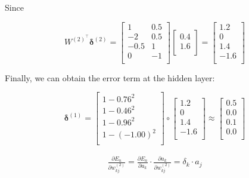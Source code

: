 \begin{solution}
    Since

    \[
        W^{(2)}^\intercal\bm{\delta}^{(2)}
        =
        \begin{bmatrix}
            1    & 0.5 \\
            -2   & 0.5 \\
            -0.5 & 1   \\
            0    & -1  \\
        \end{bmatrix}
        \begin{bmatrix}
            0.4 \\
            1.6 \\
        \end{bmatrix}
        =
        \begin{bmatrix}
            1.2  \\
            0    \\
            1.4  \\
            -1.6 \\
        \end{bmatrix}
    \]

    Finally, we can obtain the error term at the hidden layer:

    \[
        \bm{\delta}^{(1)} =
        \begin{bmatrix}
            1 - 0.76^2    \\
            1 - 0.46^2    \\
            1 - 0.96^2    \\
            1 - (-1.00)^2 \\
        \end{bmatrix}
        \circ
        \begin{bmatrix}
            1.2  \\
            0    \\
            1.4  \\
            -1.6 \\
        \end{bmatrix}
        \approx
        \begin{bmatrix}
            0.5 \\
            0.0 \\
            0.1 \\
            0.0 \\
        \end{bmatrix}
    \]


    \[
        \begin{align*}
            \frac{\partial E_n}{\partial w^{(2)}_{kj}}
            = \frac{\partial E_n}{\partial a_k} \cdot \frac{\partial a_k}{ \partial w^{(2)}_{kj} }
            = \delta_k \cdot a_j
        \end{align*}
    \]


\end{solution}
